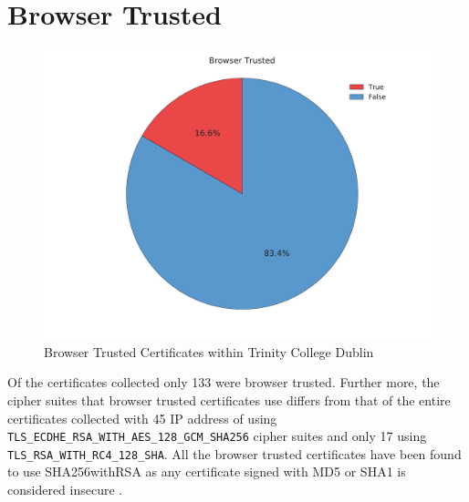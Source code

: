 \documentclass[a4wide,leqno,12pt]{report}
\begin{document}
\section{Browser Trusted}
\begin{figure}[H]
\centering
\includegraphics[scale=.45]{pdf_images/BrowserTrusted}
\caption{Browser Trusted Certificates within Trinity College Dublin}
\label{fig:browserTrusted}
\end{figure}
Of the certificates collected only 133 were browser trusted. Further more, the cipher suites that browser trusted certificates use differs from that of the entire certificates collected with 45 IP address of using\\ \texttt{TLS\_ECDHE\_RSA\_WITH\_AES\_128\_GCM\_SHA256} cipher suites and only 17 using \texttt{TLS\_RSA\_WITH\_RC4\_128\_SHA}. All the browser trusted certificates have been found to use SHA256withRSA as any certificate signed with MD5 or SHA1 is considered insecure \cite{ssllabs}.\\
\end{document}
